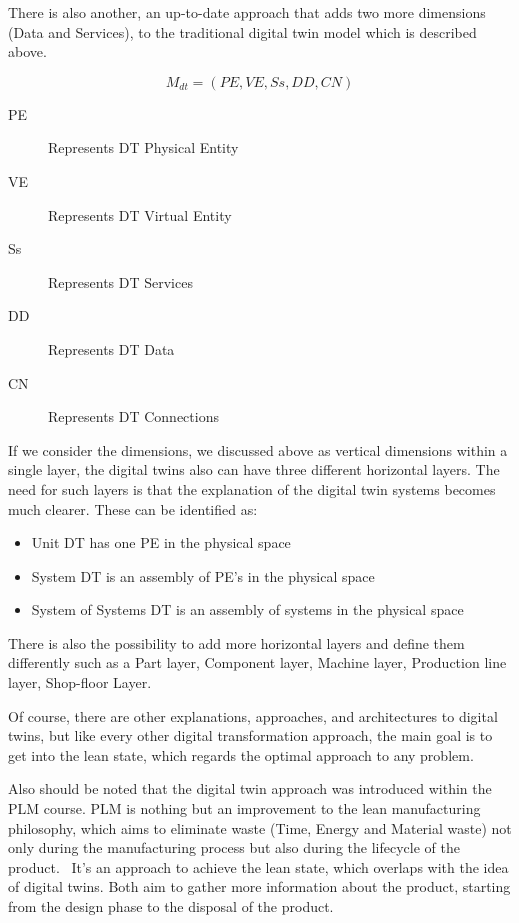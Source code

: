 \documentclass[9pt,conference]{IEEEtran}
\begin{document}
    There is also another, an up-to-date approach that adds two more dimensions (Data and Services), to the traditional digital twin model which is described above.~\cite{DTGRIEVES}

    \begin{equation}
        M_{dt} = (PE,VE,Ss,DD,CN)
    \end{equation}

    \begin{description}
        \item[PE] Represents DT Physical Entity
        \item[VE] Represents DT Virtual Entity
        \item[Ss] Represents DT Services
        \item[DD] Represents DT Data
        \item[CN] Represents DT Connections
    \end{description}
    If we consider the dimensions, we discussed above as vertical dimensions within a single layer, the digital twins also can have three different horizontal layers\cite{TAOCHAPTER1}. 
    The need for such layers is that the explanation of the digital twin systems becomes much clearer. These can be identified as:
    \begin{itemize}
        \item Unit DT has one PE in the physical space
        \item System DT is an assembly of PE's in the physical space
        \item System of Systems DT is an assembly of systems in the physical space
    \end{itemize} 

    There is also the possibility to add more horizontal layers and define them differently such as a Part layer, Component layer, Machine layer, Production line layer, Shop-floor Layer.\cite{MultiScaleModeling4Layers}
    
    
    Of course, there are other explanations, approaches, and architectures to digital twins, but like every other digital transformation approach, the main goal is to get into the lean state,
    which regards the optimal approach to any problem. 
    
    Also should be noted that the digital twin approach was introduced within the PLM course. PLM is nothing but an improvement to the lean manufacturing philosophy,
    which aims to eliminate waste (Time, Energy and Material waste) not only during the
    manufacturing process but also during the lifecycle of the product.~\cite{grieves2006PLM} 
    It's an approach to achieve the lean state, which overlaps with the idea of digital twins. Both aim to gather more information about the product, starting from the design phase to the disposal of the product.
    
\end{document}
